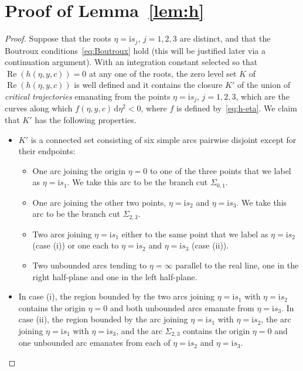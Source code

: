 \section{Proof of Lemma~\ref{lem:h}}

\begin{proof}
Suppose that the roots $\eta=\mathrm{i} s_j$, $j=1,2,3$ are distinct, and that the Boutroux conditions~\eqref{eq:Boutroux} hold (this will be justified later via a continuation argument). With an integration constant selected so that $\operatorname{Re}(h(\eta,y,c))=0$ at any one of the roots, the zero level set $K$ of $\operatorname{Re}(h(\eta,y,c))$ is well defined and it contains the closure $K'$ of the union of \emph{critical trajectories} emanating from the points $\eta=\mathrm{i} s_j$, $j=1,2,3$, which are the curves along which $f(\eta,y,c)\,\mathrm{d}\eta^2<0$, where $f$ is defined by~\eqref{eq:h-eta}. We claim that $K'$ has the following properties.
\begin{itemize}\itemsep=0pt
\item $K'$ is a connected set consisting of six simple arcs pairwise disjoint except for their endpoints:
\begin{itemize}\itemsep=0pt
\item One arc joining the origin $\eta=0$ to one of the three points that we label as $\eta=\mathrm{i} s_1$. We take this arc to be the branch cut $\Sigma_{0,1}$.
\item One arc joining the other two points, $\eta=\mathrm{i} s_2$ and $\eta=\mathrm{i} s_3$. We take this arc to be the branch cut $\Sigma_{2,3}$.
\item Two arcs joining $\eta=\mathrm{i} s_1$ either to the same point that we label as $\eta=\mathrm{i} s_2$ (case (i)) or one each to $\eta=\mathrm{i} s_2$ and $\eta=\mathrm{i} s_3$ (case (ii)).
\item Two unbounded arcs tending to $\eta=\infty$ parallel to the real line, one in the right half-plane and one in the left half-plane.
\end{itemize}
\item In case (i), the region bounded by the two arcs joining $\eta=\mathrm{i} s_1$ with $\eta=\mathrm{i} s_2$ contains the origin $\eta=0$ and both unbounded arcs emanate from $\eta=\mathrm{i} s_3$. In case (ii), the region bounded by the arc joining $\eta=\mathrm{i} s_1$ with $\eta=\mathrm{i} s_2$, the arc joining $\eta=\mathrm{i} s_1$ with $\eta=\mathrm{i} s_3$, and the arc $\Sigma_{2,3}$ contains the origin $\eta=0$ and one unbounded arc emanates from each of $\eta=\mathrm{i} s_2$ and $\eta=\mathrm{i} s_3$.

\end{itemize}
\end{proof}
